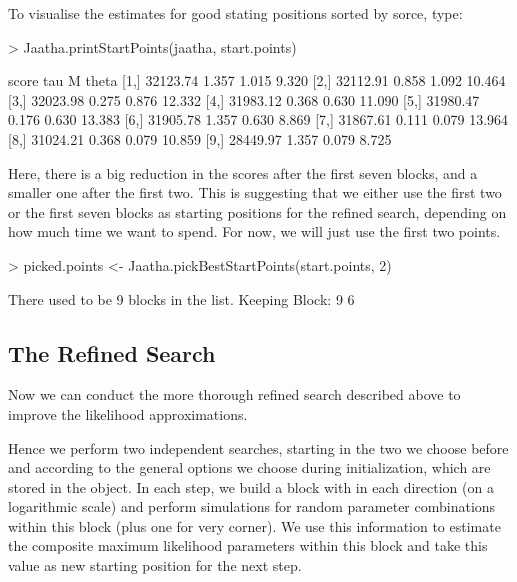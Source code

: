 \documentclass[a4paper]{article}
\begin{document}
\noindent
To visualise the estimates for good stating positions sorted by sorce, type:
\begin{Schunk}
\begin{Sinput}
> Jaatha.printStartPoints(jaatha, start.points)
\end{Sinput}
\begin{Soutput}
         score   tau     M  theta
 [1,] 32123.74 1.357 1.015  9.320
 [2,] 32112.91 0.858 1.092 10.464
 [3,] 32023.98 0.275 0.876 12.332
 [4,] 31983.12 0.368 0.630 11.090
 [5,] 31980.47 0.176 0.630 13.383
 [6,] 31905.78 1.357 0.630  8.869
 [7,] 31867.61 0.111 0.079 13.964
 [8,] 31024.21 0.368 0.079 10.859
 [9,] 28449.97 1.357 0.079  8.725
\end{Soutput}
\end{Schunk}
Here, there is a big reduction in the scores after the first seven blocks, and a smaller one 
after the first two. This is suggesting that we either use the first two or the
first seven 
blocks as starting positions for the refined search, depending on how much time we want to
spend. For now, we will just use the first two points.
\begin{Schunk}
\begin{Sinput}
> picked.points <- Jaatha.pickBestStartPoints(start.points, 2)
\end{Sinput}
\begin{Soutput}
There used to be 9 blocks in the list.
Keeping Block: 9  6  
\end{Soutput}
\end{Schunk}


\subsection{The Refined Search}


\noindent
Now we can conduct the more thorough refined search described above to improve the
likelihood approximations. 



\noindent
Hence we perform two independent searches, starting in the two \verb@startPoints@ we choose before 
and according to the general options we choose during initialization, which are stored in the 
\verb@jaatha@ object. In each step, we build a block with \verb@halfBlockSize@ in each direction
(on a logarithmic scale) and perform simulations for \verb@nSim@ random parameter combinations within
this block (plus one for very corner). We use this information to estimate the composite maximum 
likelihood parameters within this block and take this value as new starting position for the next
step. 
\end{document}
